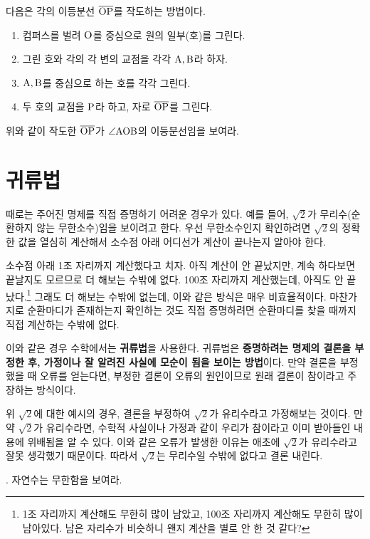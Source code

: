 다음은 각의 이등분선 \(\overline{\rm{OP}}\)를 작도하는 방법이다.
\begin{enumerate}
    \item 컴퍼스를 벌려 \(\rm{O}\)를 중심으로 원의 일부(호)를 그린다.
    \item 그린 호와 각의 각 변의 교점을 각각 \(\rm{A}, \rm{B}\)라 하자.
    \item \(\rm{A}, \rm{B}\)를 중심으로 하는 호를 각각 그린다.
    \item 두 호의 교점을 \(\rm{P}\)라 하고, 자로 \(\overline{\rm{OP}}\)를 그린다.
\end{enumerate}
위와 같이 작도한 \(\overline{\rm{OP}}\)가 \(\angle \rm{AOB}\)의 이등분선임을 보여라.

\pagebreak

\section{귀류법}

때로는 주어진 명제를 직접 증명하기 어려운 경우가 있다. 예를 들어, \(\sqrt{2}\)가 무리수(순환하지 않는 무한소수)임을 보이려고 한다. 우선 무한소수인지 확인하려면 \(\sqrt{2}\)의 정확한 값을 열심히 계산해서 소수점 아래 어디선가 계산이 끝나는지 알아야 한다.

소수점 아래 1조 자리까지 계산했다고 치자. 아직 계산이 안 끝났지만, 계속 하다보면 끝날지도 모르므로 더 해보는 수밖에 없다. 100조 자리까지 계산했는데, 아직도 안 끝났다.\footnote{1조 자리까지 계산해도 무한히 많이 남았고, 100조 자리까지 계산해도 무한히 많이 남아있다. 남은 자리수가 비슷하니 왠지 계산을 별로 안 한 것 같다?} 그래도 더 해보는 수밖에 없는데, 이와 같은 방식은 매우 비효율적이다. 마찬가지로 순환마디가 존재하는지 확인하는 것도 직접 증명하려면 순환마디를 찾을 때까지 직접 계산하는 수밖에 없다.

이와 같은 경우 수학에서는 \textbf{귀류법}을 사용한다. 귀류법은 \textbf{증명하려는 명제의 결론을 부정한 후, 가정이나 잘 알려진 사실에 모순이 됨을 보이는 방법}이다. 만약 결론을 부정했을 때 오류를 얻는다면, 부정한 결론이 오류의 원인이므로 원래 결론이 참이라고 주장하는 방식이다.

위 \(\sqrt{2}\)에 대한 예시의 경우, 결론을 부정하여 \(\sqrt{2}\)가 유리수라고 가정해보는 것이다. 만약 \(\sqrt{2}\)가 유리수라면, 수학적 사실이나 가정과 같이 우리가 참이라고 이미 받아들인 내용에 위배됨을 알 수 있다. 이와 같은 오류가 발생한 이유는 애초에 \(\sqrt{2}\)가 유리수라고 잘못 생각했기 때문이다. 따라서 \(\sqrt{2}\)는 무리수일 수밖에 없다고 결론 내린다.

\ex. 자연수는 무한함을 보여라.

